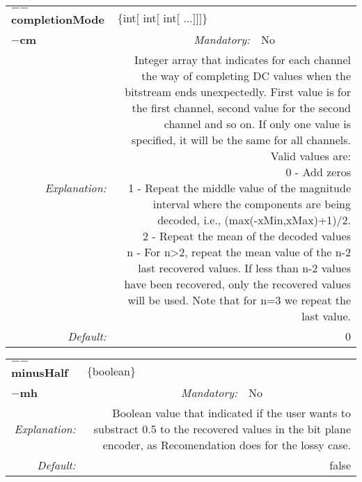 \begin{center}\begin{tabular}{|rr|rlrl|}
\hline
\multicolumn{2}{|l|}{\textbf{$-$$-$completionMode}} & \multicolumn{4}{|l|}{$\{$int$[$ int$[$ int$[$ ...$]$$]$$]$$\}$} \\
\cline{3-6}
\multicolumn{2}{|l|}{\textbf{$-$cm}} & \emph{Mandatory:} & No & &  \\
\hline
\emph{Explanation:} & \multicolumn{5}{|p{12cm}|}{Integer array that indicates for each channel the way of completing DC values when the bitstream ends unexpectedly. First value is for the first channel, second value for the second channel and so on. If only one value is specified, it will be the same for all channels. \newline Valid values are:\newline 0 - Add zeros \newline 1 - Repeat the middle value of the magnitude interval where the components are being decoded, i.e., (max(-xMin,xMax)+1)/2. \newline 2 - Repeat the mean of the decoded values \newline n - For n>2, repeat the mean value of the n-2 last recovered values. If less than n-2 values have been recovered, only the recovered values will be used. Note that for n=3 we repeat the last value.} \\
\hline
\emph{Default:} & \multicolumn{5}{|p{12cm}|}{0 } \\
\hline
\end{tabular}\end{center}
\begin{center}\begin{tabular}{|rr|rlrl|}
\hline
\multicolumn{2}{|l|}{\textbf{$-$$-$minusHalf}} & \multicolumn{4}{|l|}{$\{$boolean$\}$} \\
\cline{3-6}
\multicolumn{2}{|l|}{\textbf{$-$mh}} & \emph{Mandatory:} & No & &  \\
\hline
\emph{Explanation:} & \multicolumn{5}{|p{12cm}|}{Boolean value that indicated if the user wants to substract 0.5 to the recovered values in the bit plane encoder, as Recomendation does for the lossy case.} \\
\hline
\emph{Default:} & \multicolumn{5}{|p{12cm}|}{false } \\
\hline
\end{tabular}\end{center}

